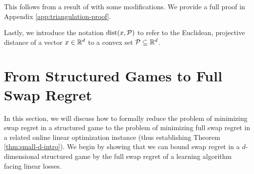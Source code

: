 \documentclass[final,12pt]{alt2025}
\begin{document}
This follows from a result of \cite{bronshteyn1975approximation} with some modifications. We provide a full proof in Appendix \ref{app:triangulation-proof}.

Lastly, we introduce the notation $\text{dist}(x,\mathcal{P})$ to refer to the Euclidean, projective distance of a vector $x \in \mathbb{R}^d$ to a convex set $\mathcal{P} \subseteq \mathbb{R}^d$.


\section{From Structured Games to Full Swap Regret}

In this section, we will  discuss how to formally reduce the problem of minimizing swap regret in a structured game to the problem of minimizing full swap regret in a related online linear optimization instance (thus establishing Theorem \ref{thm:small-d-intro}). We begin by showing that we can bound swap regret in a $d$-dimensional structured game by the full swap regret of a learning algorithm facing linear losses.
\end{document}
